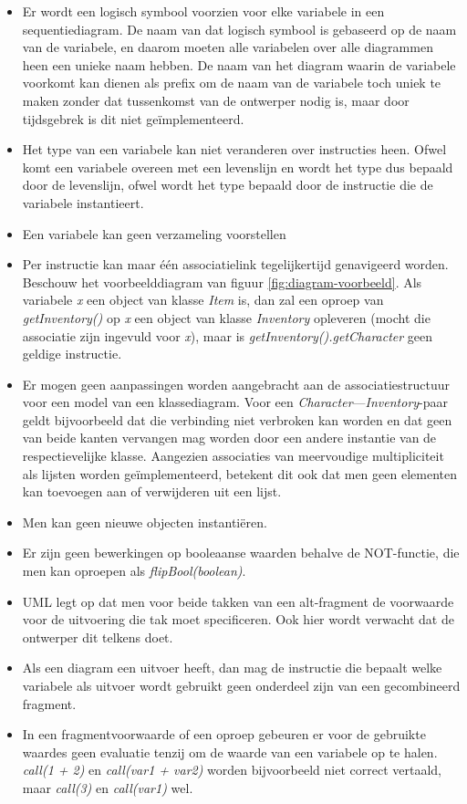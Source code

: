 \begin{itemize}
	\item Er wordt een logisch symbool voorzien voor elke variabele in een sequentiediagram. De naam van dat logisch symbool is gebaseerd op de naam van de variabele, en daarom moeten alle variabelen over alle diagrammen heen een unieke naam hebben. De naam van het diagram waarin de variabele voorkomt kan dienen als prefix om de naam van de variabele toch uniek te maken zonder dat tussenkomst van de ontwerper nodig is, maar door tijdsgebrek is dit niet ge\"implementeerd.
	\item Het type van een variabele kan niet veranderen over instructies heen. Ofwel komt een variabele overeen met een levenslijn en wordt het type dus bepaald door de levenslijn, ofwel wordt het type bepaald door de instructie die de variabele instantieert.
	\item Een variabele kan geen verzameling voorstellen
	\item Per instructie kan maar \'e\'en associatielink tegelijkertijd genavigeerd worden. Beschouw het voorbeelddiagram van figuur \ref{fig:diagram-voorbeeld}. Als variabele \textit{x} een object van klasse \textit{Item} is, dan zal een oproep van \textit{getInventory()} op \textit{x} een object van klasse \textit{Inventory} opleveren (mocht die associatie zijn ingevuld voor \textit{x}), maar is \textit{getInventory().getCharacter} geen geldige instructie.
	\item Er mogen geen aanpassingen worden aangebracht aan de associatiestructuur voor een model van een klassediagram. Voor een \textit{Character}---\textit{Inventory}-paar geldt bijvoorbeeld dat die verbinding niet verbroken kan worden en dat geen van beide kanten vervangen mag worden door een andere instantie van de respectievelijke klasse. Aangezien associaties van meervoudige multipliciteit als lijsten worden ge\"implementeerd, betekent dit ook dat men geen elementen kan toevoegen aan of verwijderen uit een lijst.
	\item Men kan geen nieuwe objecten instanti\"eren.
	\item Er zijn geen bewerkingen op booleaanse waarden behalve de NOT-functie, die men kan oproepen als \textit{flipBool(boolean)}.
	\item UML legt op dat men voor beide takken van een alt-fragment de voorwaarde voor de uitvoering die tak moet specificeren. Ook hier wordt verwacht dat de ontwerper dit telkens doet.
	\item Als een diagram een uitvoer heeft, dan mag de instructie die bepaalt welke variabele als uitvoer wordt gebruikt geen onderdeel zijn van een gecombineerd fragment.
	\item In een fragmentvoorwaarde of een oproep gebeuren er voor de gebruikte waardes geen evaluatie tenzij om de waarde van een variabele op te halen. \textit{call(1 + 2)} en \textit{call(var1 + var2)} worden bijvoorbeeld niet correct vertaald, maar \textit{call(3)} en \textit{call(var1)} wel.
\end{itemize}

